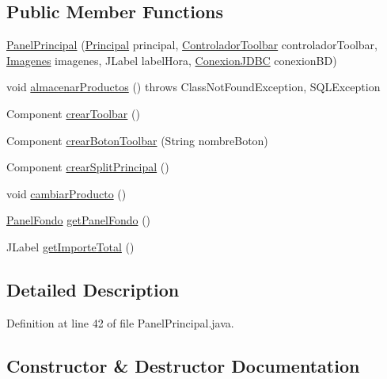 \subsection*{Public Member Functions}
\begin{DoxyCompactItemize}
\item 
\mbox{\hyperlink{classpaneles_1_1_panel_principal_a8f8bc1a008744e424eec12eae5e0a745}{Panel\+Principal}} (\mbox{\hyperlink{classvistas_1_1_principal}{Principal}} principal, \mbox{\hyperlink{classcontroladores_1_1_controlador_toolbar}{Controlador\+Toolbar}} controlador\+Toolbar, \mbox{\hyperlink{classimagenes_1_1_imagenes}{Imagenes}} imagenes, J\+Label label\+Hora, \mbox{\hyperlink{classmysql_1_1_conexion_j_d_b_c}{Conexion\+J\+D\+BC}} conexion\+BD)
\item 
void \mbox{\hyperlink{classpaneles_1_1_panel_principal_ad46c27384163d0757eadfe86cf72ee70}{almacenar\+Productos}} ()  throws Class\+Not\+Found\+Exception, S\+Q\+L\+Exception 
\item 
Component \mbox{\hyperlink{classpaneles_1_1_panel_principal_accd82709ae4701f14d1b5a4bbb8f3aae}{crear\+Toolbar}} ()
\item 
Component \mbox{\hyperlink{classpaneles_1_1_panel_principal_a45d159d89db6217a595c166bf2f0b2ea}{crear\+Boton\+Toolbar}} (String nombre\+Boton)
\item 
Component \mbox{\hyperlink{classpaneles_1_1_panel_principal_abf6e9ec8437453a751ea1a4bcc33fb87}{crear\+Split\+Principal}} ()
\item 
void \mbox{\hyperlink{classpaneles_1_1_panel_principal_aa2151461e479985277d05375c02b1022}{cambiar\+Producto}} ()
\item 
\mbox{\hyperlink{classpaneles_1_1_panel_fondo}{Panel\+Fondo}} \mbox{\hyperlink{classpaneles_1_1_panel_principal_ab8efee7c290494ba31d026c47dbbcefb}{get\+Panel\+Fondo}} ()
\item 
J\+Label \mbox{\hyperlink{classpaneles_1_1_panel_principal_a5ee2138a32b7b6bc6a0f7b3bd68f4821}{get\+Importe\+Total}} ()
\end{DoxyCompactItemize}


\subsection{Detailed Description}


Definition at line 42 of file Panel\+Principal.\+java.



\subsection{Constructor \& Destructor Documentation}
\mbox{\label{classpaneles_1_1_panel_principal_a8f8bc1a008744e424eec12eae5e0a745}} 
